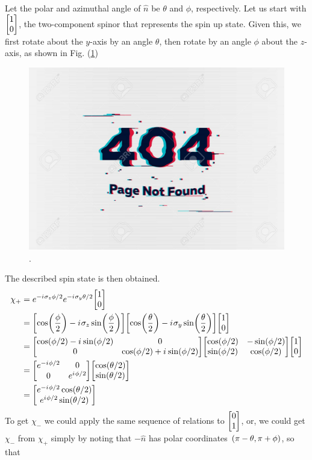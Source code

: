 Let the polar and azimuthal angle of $\hat{n}$ be $\theta$ and $\phi$, respectively. Let us start with $\mqty[1 \\ 0]$, the two-component spinor that represents the spin up state. Given this, we first rotate about the $y$-axis by an angle $\theta$, then rotate by an angle $\phi$ about the $z$-axis, as shown in Fig. (\ref{chapter18.fig5})


\begin{figure}
	\centering
	\includegraphics[width=0.5\linewidth]{Pictures/not-found.jpg}
	\caption{.}
	\label{chapter18.fig5}
\end{figure}

The described spin state is then obtained.
\begin{align*}
\chi_{+} 
&= e^{-\iu \sigma_z \phi/2} e^{-\iu \sigma_y \theta/2} \mqty[1 \\ 0] \\
&=  \qty[\cos(\frac{\phi}{2}) - \iu \sigma_z \sin(\frac{\phi}{2})] \qty[\cos(\frac{\theta}{2}) - \iu \sigma_y \sin(\frac{\theta}{2})] \mqty[1 \\ 0] \\
&= \mqty[\cos(\phi/2) - \iu \sin(\phi/2) & 0 \\ 0 & \cos(\phi/2) + \iu \sin(\phi/2)] \mqty[\cos(\phi/2) & -\sin(\phi/2) \\ \sin(\phi/2) & \cos(\phi/2)] \mqty[1 \\ 0] \\
&= \mqty[e^{-\iu \phi/2} & 0 \\ 0 & e^{\iu \phi/2}]
\mqty[\cos(\theta/2) \\ \sin(\theta/2)] \\
&= \mqty[e^{-\iu \phi/2}\cos(\theta/2) \\ e^{\iu \phi/2}\sin(\theta/2)]
\end{align*}
To get $\chi_{-}$ we could apply the same sequence of relations to $\mqty[0 \\1]$, or, we could get $\chi_{-}$ from  $\chi_{+}$ simply by noting that $-\hat{n}$ has polar coordinates $\qty(\pi - \theta, \pi + \phi)$, so that

